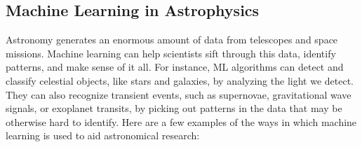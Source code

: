 \subsection{Machine Learning in Astrophysics}

Astronomy generates an enormous amount of data from telescopes and space missions. Machine learning can help scientists sift through this data, identify patterns, and make sense of it all. For instance, ML algorithms can detect and classify celestial objects, like stars and galaxies, by analyzing the light we detect. They can also recognize transient events, such as supernovae, gravitational wave signals, or exoplanet transits, by picking out patterns in the data that may be otherwise hard to identify. Here are a few examples of the ways in which machine learning is used to aid astronomical research:

